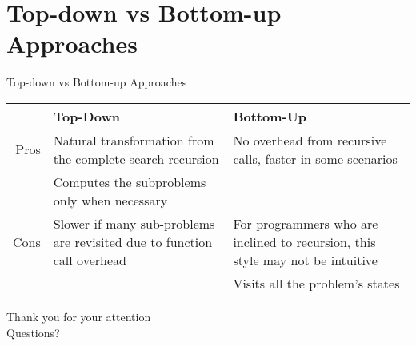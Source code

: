 \section{Top-down vs Bottom-up Approaches}

\begin{frame}{Top-down vs Bottom-up Approaches}
  \begin{tabular}{ r | p{5cm} | p{5cm}}
   & \textbf{Top-Down} & \textbf{Bottom-Up} \\
   \hline
   Pros & Natural transformation from the complete search recursion & No overhead from recursive calls, faster in some scenarios \\
        & Computes the subproblems only when necessary & \\
   \hline
   Cons & Slower if many sub-problems are revisited due to function call overhead & For programmers who are inclined to recursion, this style may not be intuitive \\
        &                                                                         & Visits all the problem's states \\
  \end{tabular}
\end{frame}


\begin{frame}
  Thank you for your attention
  \\
  \vspace{5em}
  Questions?  
\end{frame}